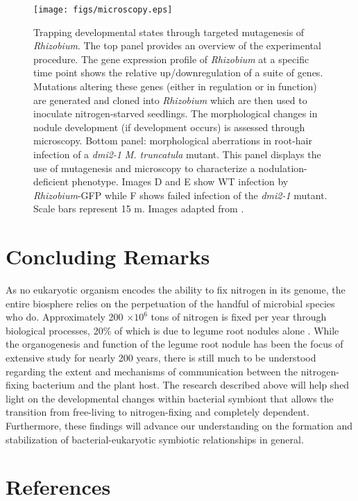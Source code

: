 \begin{figure}[!h]
	\centerline{\texttt{[image: figs/microscopy.eps]}}
	\caption{Trapping developmental states through targeted mutagenesis of
		\textit{Rhizobium}. The top panel provides an overview of the
		experimental procedure. The gene expression profile of
		\textit{Rhizobium} at a specific time point shows the relative
		up/downregulation of a suite of genes. Mutations altering these
		genes (either in regulation or in function) are generated and cloned
		into \textit{Rhizobium} which are then used to inoculate
		nitrogen-starved seedlings. The morphological changes in nodule
		development (if development occurs) is assessed through
		microscopy. Bottom panel: morphological aberrations in root-hair
		infection of a \textit{dmi2-1} \textit{M.  truncatula} mutant.
		This panel displays the use of mutagenesis and microscopy to
		characterize a nodulation-deficient phenotype.  Images D and E
		show WT infection by \textit{Rhizobium}-GFP while F shows failed
		infection of the \textit{dmi2-1} mutant. Scale bars represent 15
		\textmu m.  Images adapted from \citet{Esseling:2004ja}.} 
	\label{fig:microscopy}	

\end{figure}
\newpage
\section*{Concluding Remarks} 
As no eukaryotic organism encodes the ability to fix nitrogen in its genome,
the entire biosphere relies on the perpetuation of the handful of microbial species
who do. Approximately 200 $\times 10^6$ tons of nitrogen is fixed per year through
biological processes, 20\% of which is due to legume root nodules alone
\cite{Brady:2008vg}. While the organogenesis and function of the legume root
nodule has been the focus of extensive study for nearly 200 years, there is
still much to be understood regarding the extent and mechanisms of communication
between the nitrogen-fixing bacterium and the plant host. The research described
above will help shed light on the developmental changes within bacterial
symbiont that allows the transition from free-living to nitrogen-fixing and
completely dependent. Furthermore, these findings will advance our understanding
on the formation and stabilization of bacterial-eukaryotic symbiotic
relationships in general.  

\section*{References}




